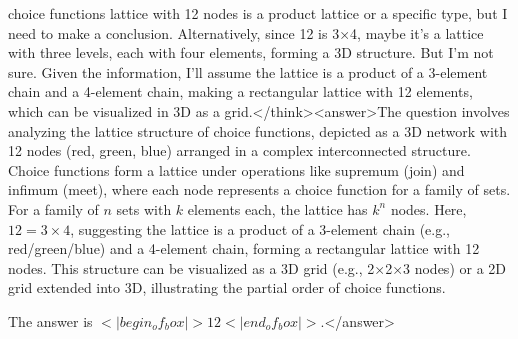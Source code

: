 choice functions lattice with 12 nodes is a product lattice or a specific type, but I need to make a conclusion. Alternatively, since 12 is 3×4, maybe it's a lattice with three levels, each with four elements, forming a 3D structure. But I'm not sure. Given the information, I'll assume the lattice is a product of a 3-element chain and a 4-element chain, making a rectangular lattice with 12 elements, which can be visualized in 3D as a grid.</think><answer>The question involves analyzing the lattice structure of choice functions, depicted as a 3D network with 12 nodes (red, green, blue) arranged in a complex interconnected structure. Choice functions form a lattice under operations like supremum (join) and infimum (meet), where each node represents a choice function for a family of sets. For a family of \( n \) sets with \( k \) elements each, the lattice has \( k^n \) nodes. Here, \( 12 = 3 \times 4 \), suggesting the lattice is a product of a 3-element chain (e.g., red/green/blue) and a 4-element chain, forming a rectangular lattice with 12 nodes. This structure can be visualized as a 3D grid (e.g., 2×2×3 nodes) or a 2D grid extended into 3D, illustrating the partial order of choice functions.  

The answer is \(<|begin_of_box|>12<|end_of_box|>\).</answer>